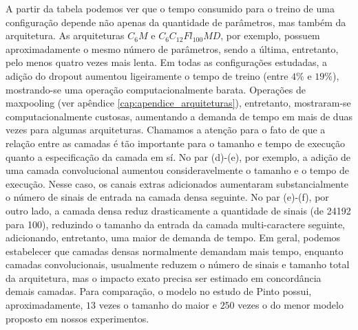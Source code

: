 A partir da tabela podemos ver que o tempo consumido para o treino de uma configuração depende não apenas da quantidade de parâmetros, mas também da arquitetura. As arquiteturas $C_6M$ e $C_6C_{12}Fl_{100}MD$, por exemplo, possuem aproximadamente o mesmo número de parâmetros, sendo a última, entretanto, pelo menos quatro vezes mais lenta. Em todas as configurações estudadas, a adição do dropout aumentou ligeiramente o tempo de treino (entre $4\%$ e $19\%$), mostrando-se uma operação computacionalmente barata. Operações de maxpooling (ver apêndice \ref{cap:apendice_arquiteturas}), entretanto, mostraram-se computacionalmente custosas, aumentando a demanda de tempo em mais de duas vezes para algumas arquiteturas. Chamamos a atenção para o fato de que a relação entre as camadas é tão importante para o tamanho e tempo de execução quanto a especificação da camada em sí. No par (d)-(e), por exemplo, a adição de uma camada convolucional aumentou consideravelmente o tamanho e o tempo de execução. Nesse caso, os canais extras adicionados aumentaram substancialmente o número de sinais de entrada na camada densa seguinte. No par (e)-(f), por outro lado, a camada densa reduz drasticamente a quantidade de sinais (de 24192 para 100), reduzindo o tamanho da entrada da camada multi-caractere seguinte, adicionando, entretanto, uma maior de demanda de tempo. Em geral, podemos estabelecer que camadas densas normalmente demandam mais tempo, enquanto camadas convolucionais, usualmente reduzem o número de sinais e tamanho total da arquitetura, mas o impacto exato precisa ser estimado em concordância demais camadas. Para comparação, o modelo no estudo de Pinto\cite{otaro} possui, aproximadamente, $13$ vezes o tamanho do maior e $250$ vezes o do menor modelo proposto em nossos experimentos.

